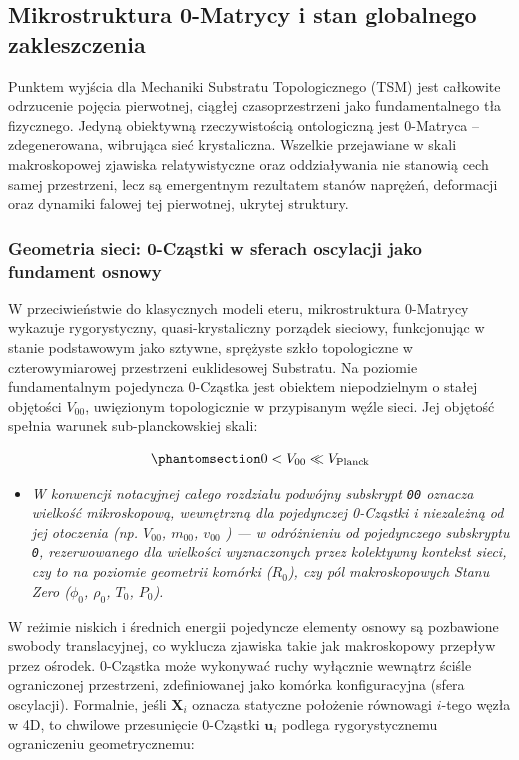 \documentclass[
  polish,
  letterpaper,
  DIV=11,
  numbers=noendperiod,
  oneside]{scrartcl}
\providecommand{\tightlist}{%
  \setlength{\itemsep}{0pt}\setlength{\parskip}{0pt}}
\begin{document}
\subsection{Mikrostruktura 0-Matrycy i stan globalnego
zakleszczenia}\label{sec-1-2}

Punktem wyjścia dla Mechaniki Substratu Topologicznego (TSM) jest
całkowite odrzucenie pojęcia pierwotnej, ciągłej czasoprzestrzeni jako
fundamentalnego tła fizycznego. Jedyną obiektywną rzeczywistością
ontologiczną jest 0-Matryca -- zdegenerowana, wibrująca sieć
krystaliczna. Wszelkie przejawiane w skali makroskopowej zjawiska
relatywistyczne oraz oddziaływania nie stanowią cech samej przestrzeni,
lecz są emergentnym rezultatem stanów naprężeń, deformacji oraz dynamiki
falowej tej pierwotnej, ukrytej struktury.

\subsubsection{Geometria sieci: 0-Cząstki w sferach oscylacji jako
fundament osnowy}\label{sec-1-2-1}

W przeciwieństwie do klasycznych modeli eteru, mikrostruktura 0-Matrycy
wykazuje rygorystyczny, quasi-krystaliczny porządek sieciowy,
funkcjonując w stanie podstawowym jako sztywne, sprężyste szkło
topologiczne w czterowymiarowej przestrzeni euklidesowej Substratu. Na
poziomie fundamentalnym pojedyncza 0-Cząstka jest obiektem niepodzielnym
o stałej objętości \(V_{00}\), uwięzionym topologicznie w przypisanym
węźle sieci. Jej objętość spełnia warunek sub-planckowskiej skali:

\begin{equation}\protect\phantomsection\label{eq-wz1-1}{0 < V_{00} \ll V_{\text{Planck}}}\end{equation}

\begin{itemize}
\tightlist
\item
  \emph{W konwencji notacyjnej całego rozdziału podwójny subskrypt
  \texttt{00} oznacza wielkość mikroskopową, wewnętrzną dla pojedynczej
  0-Cząstki i niezależną od jej otoczenia (np. \(V_{00}\), \(m_{00}\),
  \(v_{00}\) ) --- w odróżnieniu od pojedynczego subskryptu \texttt{0},
  rezerwowanego dla wielkości wyznaczonych przez kolektywny kontekst
  sieci, czy to na poziomie geometrii komórki (\(R_0\)), czy pól
  makroskopowych Stanu Zero (\(\phi_0\), \(\rho_0\), \(T_0\), \(P_0\)).}
\end{itemize}

W reżimie niskich i średnich energii pojedyncze elementy osnowy są
pozbawione swobody translacyjnej, co wyklucza zjawiska takie jak
makroskopowy przepływ przez ośrodek. 0-Cząstka może wykonywać ruchy
wyłącznie wewnątrz ściśle ograniczonej przestrzeni, zdefiniowanej jako
komórka konfiguracyjna (sfera oscylacji). Formalnie, jeśli
\(\mathbf{X}_i\) oznacza statyczne położenie równowagi \(i\)-tego węzła
w 4D, to chwilowe przesunięcie 0-Cząstki \(\mathbf{u}_i\) podlega
rygorystycznemu ograniczeniu geometrycznemu:
\end{document}
